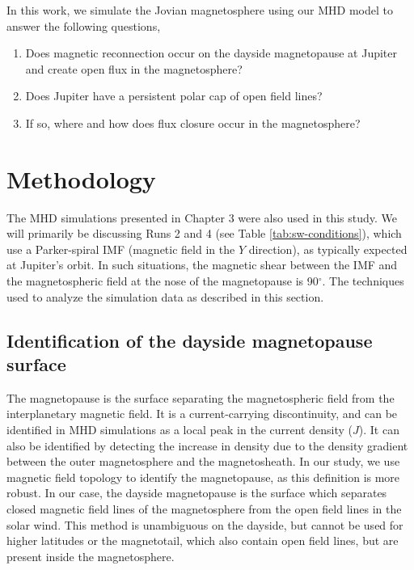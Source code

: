 In this work, we simulate the Jovian magnetosphere using our MHD model to answer the following questions,

\begin{enumerate}
    \item Does magnetic reconnection occur on the dayside magnetopause at Jupiter and create open flux in the magnetosphere?
    \item Does Jupiter have a persistent polar cap of open field lines? 
    \item If so, where and how does flux closure occur in the magnetosphere?
\end{enumerate}

\section{Methodology}
The MHD simulations presented in Chapter 3 were also used in this study. We will primarily be discussing Runs 2 and 4 (see Table \ref{tab:sw-conditions}), which use a Parker-spiral IMF (magnetic field in the $Y$ direction), as typically expected at Jupiter's orbit. In such situations, the magnetic shear between the IMF and the magnetospheric field at the nose of the magnetopause is 90$^\circ$. The techniques used to analyze the simulation data as described in this section.

\subsection{Identification of the dayside magnetopause surface}
The magnetopause is the surface separating the magnetospheric field from the interplanetary magnetic field. It is a current-carrying discontinuity, and can be identified in MHD simulations as a local peak in the current density ($J$). It can also be identified by detecting the increase in density due to the density gradient between the outer magnetosphere and the magnetosheath. In our study, we use magnetic field topology to identify the magnetopause, as this definition is more robust. In our case, the dayside magnetopause is the surface which separates closed magnetic field lines of the magnetosphere from the open field lines in the solar wind. This method is unambiguous on the dayside, but cannot be used for higher latitudes or the magnetotail, which also contain open field lines, but are present inside the magnetosphere. 

